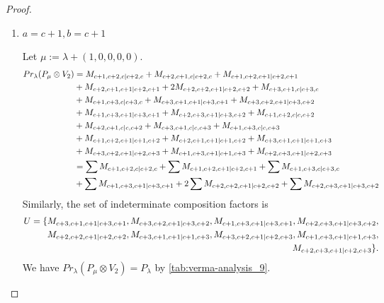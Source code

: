 \begin{proof}
\begin{enumerate}
\begin{enumerate}
      \item $a=c+1, b=c+1$\par
        Let $\mu:=\lambda + (1,0,0,0,0) $.
        \begin{equation}\notag
          \begin{aligned}
            Pr_{\lambda}(P_\mu \otimes V_{2}) &=
M_{c+1,c+2,c|c+2,c}
+ M_{c+2,c+1,c|c+2,c}
+ M_{c+1,c+2,c+1|c+2,c+1}\\
                                            &
+ M_{c+2,c+1,c+1|c+2,c+1}
+ 2M_{c+2,c+2,c+1|c+2,c+2}
+ M_{c+3,c+1,c|c+3,c}\\
                                            &
+ M_{c+1,c+3,c|c+3,c}
+ M_{c+3,c+1,c+1|c+3,c+1}
+ M_{c+3,c+2,c+1|c+3,c+2}\\
                                            &
+ M_{c+1,c+3,c+1|c+3,c+1}
+ M_{c+2,c+3,c+1|c+3,c+2}
+ M_{c+1,c+2,c|c,c+2}\\
                                            &
+ M_{c+2,c+1,c|c,c+2}
+ M_{c+3,c+1,c|c,c+3}
+ M_{c+1,c+3,c|c,c+3}\\
                                            &
+ M_{c+1,c+2,c+1|c+1,c+2}
+ M_{c+2,c+1,c+1|c+1,c+2}
+ M_{c+3,c+1,c+1|c+1,c+3}\\
                                            &
+ M_{c+3,c+2,c+1|c+2,c+3}
+ M_{c+1,c+3,c+1|c+1,c+3}
+ M_{c+2,c+3,c+1|c+2,c+3} \\
                                               &=
\sum M_{c+1,c+2,c|c+2,c}
 +\sum M_{c+1,c+2,c+1|c+2,c+1}
 +\sum M_{c+1,c+3,c|c+3,c}\\
                                            &
 +\sum M_{c+1,c+3,c+1|c+3,c+1}
 +2\sum M_{c+2,c+2,c+1|c+2,c+2}
 +\sum M_{c+2,c+3,c+1|c+3,c+2}
          \end{aligned}
        \end{equation}
      Similarly, the set of indeterminate composition factors is 
      \begin{equation}\notag
        \begin{aligned}
       U = \{
M_{c+3,c+1,c+1|c+3,c+1},
M_{c+3,c+2,c+1|c+3,c+2},
M_{c+1,c+3,c+1|c+3,c+1},
M_{c+2,c+3,c+1|c+3,c+2},\\
M_{c+2,c+2,c+1|c+2,c+2},
M_{c+3,c+1,c+1|c+1,c+3},
M_{c+3,c+2,c+1|c+2,c+3},
M_{c+1,c+3,c+1|c+1,c+3},\\
M_{c+2,c+3,c+1|c+2,c+3}
\}.   
        \end{aligned}
      \end{equation}
       We have $Pr_{\lambda}(P_\mu \otimes V_{2}) = P_\lambda  $ by \cref{tab:verma-analysis_9}.

\end{enumerate}
\end{enumerate}
\end{proof}
